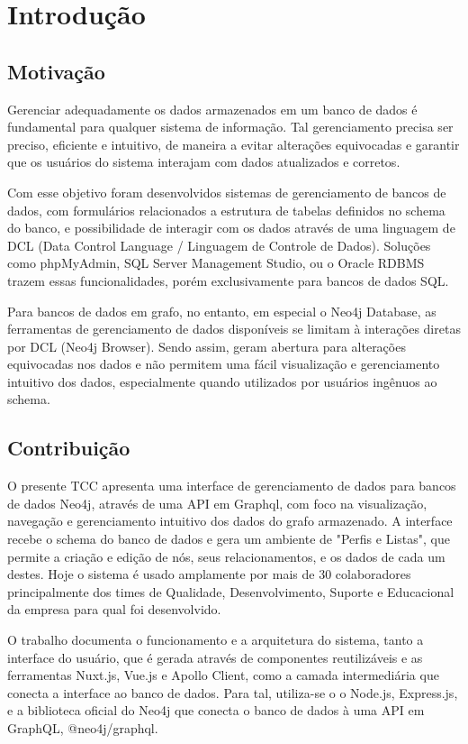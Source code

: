 \chapter{Introdução}

\section{Motivação}

Gerenciar adequadamente os dados armazenados em um banco de dados é fundamental para qualquer sistema de informação. Tal gerenciamento precisa ser preciso, eficiente e intuitivo, de maneira a evitar alterações equivocadas e garantir que os usuários do sistema interajam com dados atualizados e corretos.

Com esse objetivo foram desenvolvidos sistemas de gerenciamento de bancos de dados, com formulários relacionados {a} estrutura de tabelas definidos no schema do banco, e possibilidade de interagir com os dados através de uma linguagem de DCL (Data Control Language / Linguagem de Controle de Dados). Soluções como phpMyAdmin, SQL Server Management Studio, ou o Oracle RDBMS trazem essas funcionalidades, porém exclusivamente para bancos de dados SQL.

Para bancos de dados em grafo, no entanto, em especial o Neo4j Database, as ferramentas de gerenciamento de dados disponíveis se limitam à interações diretas por DCL (Neo4j Browser). Sendo assim, geram abertura para alterações equivocadas nos dados e não permitem uma fácil visualização e gerenciamento intuitivo dos dados, especialmente quando utilizados por usuários ingênuos ao schema.

\section{Contribuição}

O presente TCC apresenta uma interface de gerenciamento de dados para bancos de dados Neo4j, através de uma API em Graphql, com foco na visualização, navegação e gerenciamento intuitivo dos dados do grafo armazenado. A interface recebe o schema do banco de dados e gera um ambiente de "Perfis e Listas", que permite a criação e edição de nós, seus relacionamentos, e os dados de cada um destes. Hoje o sistema é usado amplamente por mais de 30 colaboradores principalmente dos times de Qualidade, Desenvolvimento, Suporte e Educacional da empresa para qual foi desenvolvido.

O trabalho documenta o funcionamento e a arquitetura do sistema, tanto a interface do usuário, que é gerada através de componentes reutilizáveis e as ferramentas Nuxt.js, Vue.js e Apollo Client, como a camada intermediária que conecta a interface ao banco de dados. Para tal, utiliza-se o o Node.js, Express.js, e a biblioteca oficial do Neo4j que conecta o banco de dados à uma API em GraphQL, @neo4j/graphql.

